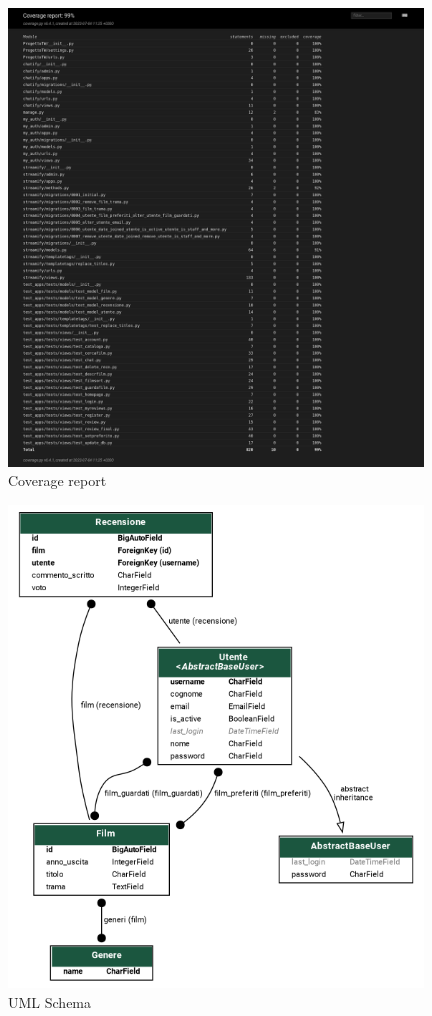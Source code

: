 \documentclass[12pt]{article}
\begin{document}
	\begin{center}
		\centering \includegraphics[width=11cm]{Immagini/coverage_report.png} \\
		\centering Coverage report	
	\end{center}
	\pagebreak
	
	
	\begin{center}
		\centering \includegraphics[width=11cm]{Immagini/streamify.png} \\
		\centering UML Schema
	\end{center}
		\pagebreak
		
\end{document}
